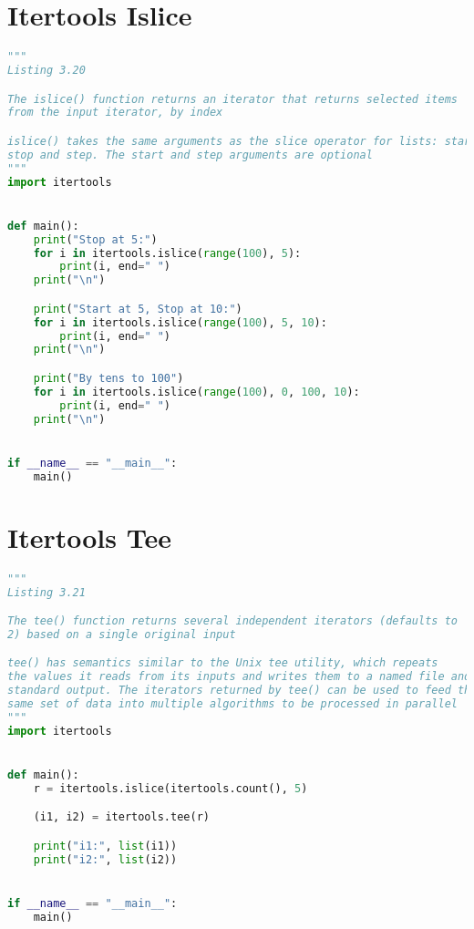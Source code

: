 \documentclass[a4paper,landscape]{report}
\begin{document}
\section{Itertools Islice}
\begin{lstlisting}[language=Python]
"""
Listing 3.20

The islice() function returns an iterator that returns selected items
from the input iterator, by index

islice() takes the same arguments as the slice operator for lists: start,
stop and step. The start and step arguments are optional
"""
import itertools


def main():
    print("Stop at 5:")
    for i in itertools.islice(range(100), 5):
        print(i, end=" ")
    print("\n")

    print("Start at 5, Stop at 10:")
    for i in itertools.islice(range(100), 5, 10):
        print(i, end=" ")
    print("\n")

    print("By tens to 100")
    for i in itertools.islice(range(100), 0, 100, 10):
        print(i, end=" ")
    print("\n")


if __name__ == "__main__":
    main()

\end{lstlisting}
\section{Itertools Tee}
\begin{lstlisting}[language=Python]
"""
Listing 3.21

The tee() function returns several independent iterators (defaults to
2) based on a single original input

tee() has semantics similar to the Unix tee utility, which repeats
the values it reads from its inputs and writes them to a named file and
standard output. The iterators returned by tee() can be used to feed the
same set of data into multiple algorithms to be processed in parallel
"""
import itertools


def main():
    r = itertools.islice(itertools.count(), 5)

    (i1, i2) = itertools.tee(r)

    print("i1:", list(i1))
    print("i2:", list(i2))


if __name__ == "__main__":
    main()

\end{lstlisting}
\end{document}
